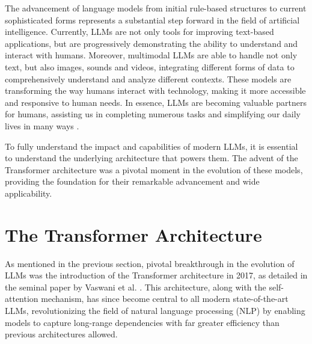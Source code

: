 The advancement of language models from initial rule-based structures to current sophisticated forms represents a substantial step forward in the field of artificial intelligence. Currently, LLMs are not only tools for improving text-based applications, but are progressively demonstrating the ability to understand and interact with humans. Moreover, multimodal LLMs are able to handle not only text, but also images, sounds and videos, integrating different forms of data to comprehensively understand and analyze different contexts. These models are transforming the way humans interact with technology, making it more accessible and responsive to human needs. In essence, LLMs are becoming valuable partners for humans, assisting us in completing numerous tasks and simplifying our daily lives in many ways \cite{researchgraph2024}.

To fully understand the impact and capabilities of modern LLMs, it is essential to understand the underlying architecture that powers them. The advent of the Transformer architecture was a pivotal moment in the evolution of these models, providing the foundation for their remarkable advancement and wide applicability.

\section{The Transformer Architecture}

As mentioned in the previous section, pivotal breakthrough in the evolution of LLMs was the introduction of the Transformer architecture in 2017, as detailed in the seminal paper by Vaswani et al. \cite{vaswani2017attention}. This architecture, along with the self-attention mechanism, has since become central to all modern state-of-the-art LLMs, revolutionizing the field of natural language processing (NLP) by enabling models to capture long-range dependencies with far greater efficiency than previous architectures allowed.


